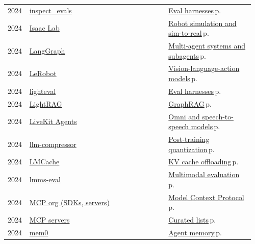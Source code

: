 \documentclass[10pt,a4paper,openany]{report}
\begin{document}
{\begin{longtable}{@{}p{0.07\linewidth}>{\raggedright}p{0.55\linewidth}>{\raggedright\arraybackslash}p{0.34\linewidth}@{}}
2024 & \href{https://github.com/UKGovernmentBEIS/inspect_evals}{inspect\_evals} & \hyperref[c:evals-0]{Eval harnesses}\,{\color{muted}\scriptsize p.\,\pageref{c:evals-0}}\\
2024 & \href{https://github.com/isaac-sim/IsaacLab}{Isaac Lab} & \hyperref[c:embodied-4]{Robot simulation and sim-to-real}\,{\color{muted}\scriptsize p.\,\pageref{c:embodied-4}}\\
2024 & \href{https://github.com/langchain-ai/langgraph}{LangGraph} & \hyperref[c:agents-7]{Multi-agent systems and subagents}\,{\color{muted}\scriptsize p.\,\pageref{c:agents-7}}\\
2024 & \href{https://github.com/huggingface/lerobot}{LeRobot} & \hyperref[c:embodied-0]{Vision-language-action models}\,{\color{muted}\scriptsize p.\,\pageref{c:embodied-0}}\\
2024 & \href{https://github.com/huggingface/lighteval}{lighteval} & \hyperref[c:evals-0]{Eval harnesses}\,{\color{muted}\scriptsize p.\,\pageref{c:evals-0}}\\
2024 & \href{https://github.com/HKUDS/LightRAG}{LightRAG} & \hyperref[c:context-7]{GraphRAG}\,{\color{muted}\scriptsize p.\,\pageref{c:context-7}}\\
2024 & \href{https://github.com/livekit/agents}{LiveKit Agents} & \hyperref[c:vlm-7]{Omni and speech-to-speech models}\,{\color{muted}\scriptsize p.\,\pageref{c:vlm-7}}\\
2024 & \href{https://github.com/vllm-project/llm-compressor}{llm-compressor} & \hyperref[c:quant-3]{Post-training quantization}\,{\color{muted}\scriptsize p.\,\pageref{c:quant-3}}\\
2024 & \href{https://github.com/LMCache/LMCache}{LMCache} & \hyperref[c:inference-4]{KV cache offloading}\,{\color{muted}\scriptsize p.\,\pageref{c:inference-4}}\\
2024 & \href{https://github.com/EvolvingLMMs-Lab/lmms-eval}{lmms-eval} & \hyperref[c:vlm-9]{Multimodal evaluation}\,{\color{muted}\scriptsize p.\,\pageref{c:vlm-9}}\\
2024 & \href{https://github.com/modelcontextprotocol}{MCP org (SDKs, servers)} & \hyperref[c:protocols-0]{Model Context Protocol}\,{\color{muted}\scriptsize p.\,\pageref{c:protocols-0}}\\
2024 & \href{https://github.com/modelcontextprotocol/servers}{MCP servers} & \hyperref[c:learn-3]{Curated lists}\,{\color{muted}\scriptsize p.\,\pageref{c:learn-3}}\\
2024 & \href{https://github.com/mem0ai/mem0}{mem0} & \hyperref[c:context-4]{Agent memory}\,{\color{muted}\scriptsize p.\,\pageref{c:context-4}}\\

\end{longtable}}
\end{document}
